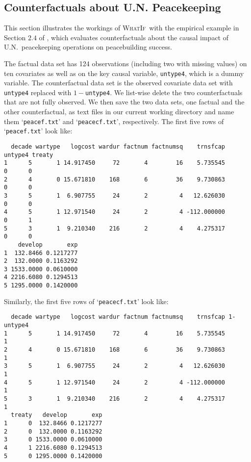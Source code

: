 \documentclass[oneside,letterpaper,titlepage]{article}
\newcommand{\WhatIf}{\textsc{WhatIf}}
\begin{document}
\subsection{Counterfactuals about U.N. Peacekeeping} \label{sec:cfeval}

This section illustrates the workings of \WhatIf\ with the empirical
example in Section $2.4$ of \citet{KinZen06}, which evaluates
counterfactuals about the causal impact of U.N.\ peacekeeping
operations on peacebuilding success.

The factual data set has 124 observations (including two with missing
values) on ten covariates as well as on the key causal variable,
\texttt{untype4}, which is a dummy variable.  The counterfactual data
set is the observed covariate data set with \texttt{untype4} replaced
with $1 - $\texttt{untype4}.  We list-wise delete the two
counterfactuals that are not fully observed.  We then save the two
data sets, one factual and the other counterfactual, as text files in
our current working directory and name them `\texttt{peacef.txt}' and
`\texttt{peacecf.txt}', respectively.  The first five rows of
`\texttt{peacef.txt}' look like:
\begin{verbatim}
  decade wartype   logcost wardur factnum factnumsq    trnsfcap untype4 treaty
1      5       1 14.917450     72       4        16    5.735545       0      0
2      4       0 15.671810    168       6        36    9.730863       0      0
3      5       1  6.907755     24       2         4   12.626030       0      0
4      5       1 12.971540     24       2         4 -112.000000       0      1
5      3       1  9.210340    216       2         4    4.275317       0      0
    develop       exp
1  132.8466 0.1217277
2  132.0000 0.1163292
3 1533.0000 0.0610000
4 2216.6080 0.1294513
5 1295.0000 0.1420000
\end{verbatim}
Similarly, the first five rows of `\texttt{peacecf.txt}' look like:
\begin{verbatim}
  decade wartype   logcost wardur factnum factnumsq    trnsfcap 1-untype4
1      5       1 14.917450     72       4        16    5.735545         1
2      4       0 15.671810    168       6        36    9.730863         1
3      5       1  6.907755     24       2         4   12.626030         1
4      5       1 12.971540     24       2         4 -112.000000         1
5      3       1  9.210340    216       2         4    4.275317         1
  treaty   develop       exp
1      0  132.8466 0.1217277
2      0  132.0000 0.1163292
3      0 1533.0000 0.0610000
4      1 2216.6080 0.1294513
5      0 1295.0000 0.1420000
\end{verbatim}
\end{document}
